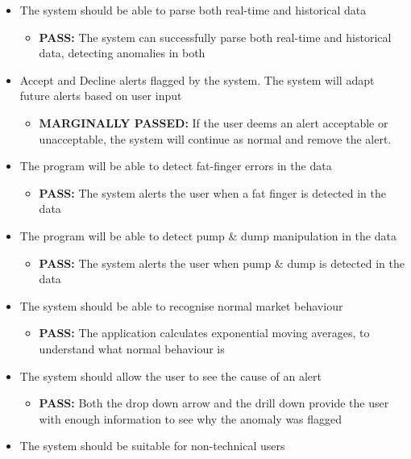 \documentclass[12pt]{article}
\begin{document}
\begin{itemize}
  \item The system should be able to parse both real-time and historical data
      \begin{itemize}
        \item \textbf{PASS:} The system can successfully parse both real-time and historical data, detecting anomalies in both
      \end{itemize}
      \item Accept and Decline alerts flagged by the system. The system will adapt future alerts based on user input
      \begin{itemize}
            \item \textbf{MARGINALLY PASSED:} If the user deems an alert acceptable or unacceptable, the system will continue as normal and remove the alert.
      \end{itemize}
      \item The program will be able to detect fat-finger errors in the data
      \begin{itemize}
        \item \textbf{PASS:} The system alerts the user when a fat finger is detected in the data
      \end{itemize}
      \item The program will be able to detect pump \& dump manipulation in the data
      \begin{itemize}
        \item \textbf{PASS:} The system alerts the user when pump \& dump is detected in the data
      \end{itemize}
      \item The system should be able to recognise normal market behaviour
      \begin{itemize}
        \item \textbf{PASS:} The application calculates exponential moving averages, to understand what normal behaviour is
      \end{itemize}
      \item The system should allow the user to see the cause of an alert
      \begin{itemize}
        \item \textbf{PASS:} Both the drop down arrow and the drill down provide the user with enough information to see why the anomaly was flagged
      \end{itemize}
      \item The system should be suitable for non-technical users

\end{itemize}
\end{document}
